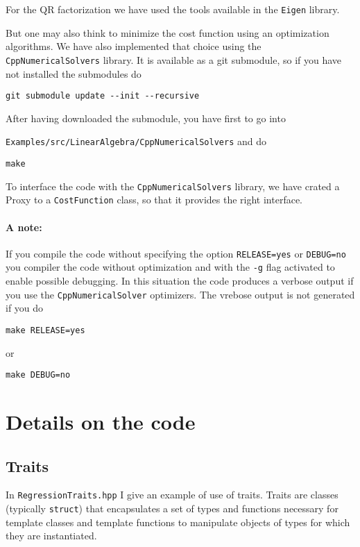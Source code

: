 \documentclass{article}
\newcommand{\li}{\lstinline}
\begin{document}
For the QR factorization we have used the tools available in the \texttt{Eigen} library.

But one may also think to minimize the cost function using an optimization algorithms.
We have also implemented that choice using the \texttt{CppNumericalSolvers} library. It is available as a git submodule, so if you have not installed the submodules
do
\begin{verbatim}
git submodule update --init --recursive
\end{verbatim}

After having downloaded the submodule, you have first to go into

\texttt{Examples/src/LinearAlgebra/CppNumericalSolvers} and do
\begin{verbatim}
make
\end{verbatim}

To interface the code with the \texttt{CppNumericalSolvers} library, we have crated a Proxy to a \texttt{CostFunction} class, so that it provides the right interface.

\paragraph{A note:} If you compile the code without specifying the option \texttt{RELEASE=yes} or \texttt{DEBUG=no} you compiler the code without optimization and with the \texttt{-g} flag
activated to enable possible debugging. In this situation the code produces a verbose output if you use the \texttt{CppNumericalSolver} optimizers. The vrebose output is not generated if you
do
\begin{verbatim}
make RELEASE=yes
\end{verbatim}
or
\begin{verbatim}
make DEBUG=no
\end{verbatim}
\section{Details on the code}
\subsection{Traits}
In \texttt{RegressionTraits.hpp} I give an example of use of traits.
Traits are classes (typically \li!struct!) that encapsulates a set of types and functions necessary for template classes and template functions to manipulate objects of types for which they are instantiated.
\end{document}
